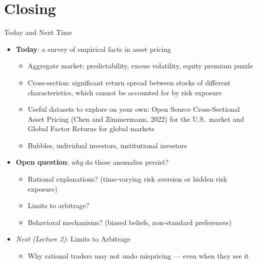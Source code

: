 \documentclass[aspectratio=169, 11pt]{beamer}
\begin{document}
\section{Closing}
\begin{frame}{Today and Next Time}
\begin{itemize}
\item \textbf{Today}: a survey of empirical facts in asset pricing
  \begin{itemize}
  \item Aggregate market: predictability, excess volatility, equity premium puzzle
  \item Cross-section: significant return spread between stocks of different characteristics, which cannot be accounted for by risk exposure 
  \item Useful datasets to explore on your own: Open Source Cross-Sectional Asset Pricing (Chen and Zimmermann, 2022) for the U.S.\ market and Global Factor Returns for global markets 
  \item Bubbles, individual investors, institutional investors
  \end{itemize}
\item \textbf{Open question}: \emph{why} do these anomalies persist?
  \begin{itemize}
  \item Rational explanations? (time-varying risk aversion or hidden risk exposure)
  \item Limits to arbitrage? 
  \item Behavioral mechanisms? (biased beliefs, non-standard preferences)
  \end{itemize}
\item \textit{Next (Lecture 2)}: Limits to Arbitrage
  \begin{itemize}
  \item Why rational traders may not undo mispricing --- even when they see it
  \end{itemize}
\end{itemize}
\end{frame}
\end{document}
